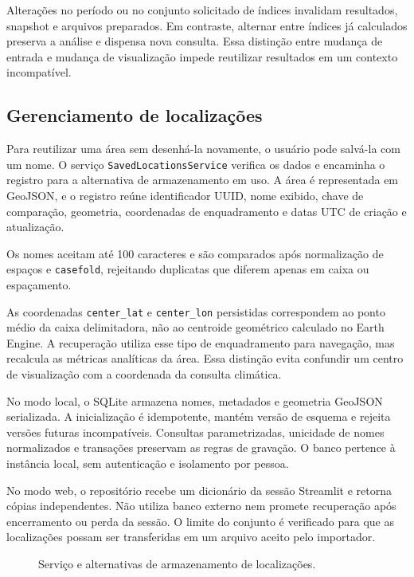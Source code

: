 Alterações no período ou no conjunto solicitado de índices invalidam resultados, snapshot e arquivos preparados. Em contraste, alternar entre índices já calculados preserva a análise e dispensa nova consulta. Essa distinção entre mudança de entrada e mudança de visualização impede reutilizar resultados em um contexto incompatível.

\subsection{Gerenciamento de localizações}

Para reutilizar uma área sem desenhá-la novamente, o usuário pode salvá-la com um nome. O serviço \texttt{SavedLocationsService} verifica os dados e encaminha o registro para a alternativa de armazenamento em uso. A área é representada em GeoJSON, e o registro reúne identificador UUID, nome exibido, chave de comparação, geometria, coordenadas de enquadramento e datas UTC de criação e atualização.

Os nomes aceitam até 100 caracteres e são comparados após normalização de espaços e \texttt{casefold}, rejeitando duplicatas que diferem apenas em caixa ou espaçamento.

As coordenadas \texttt{center\_lat} e \texttt{center\_lon} persistidas correspondem ao ponto médio da caixa delimitadora, não ao centroide geométrico calculado no Earth Engine. A recuperação utiliza esse tipo de enquadramento para navegação, mas recalcula as métricas analíticas da área. Essa distinção evita confundir um centro de visualização com a coordenada da consulta climática.

No modo local, o SQLite armazena nomes, metadados e geometria GeoJSON serializada. A inicialização é idempotente, mantém versão de esquema e rejeita versões futuras incompatíveis. Consultas parametrizadas, unicidade de nomes normalizados e transações preservam as regras de gravação. O banco pertence à instância local, sem autenticação e isolamento por pessoa.

No modo web, o repositório recebe um dicionário da sessão Streamlit e retorna cópias independentes. Não utiliza banco externo nem promete recuperação após encerramento ou perda da sessão. O limite do conjunto é verificado para que as localizações possam ser transferidas em um arquivo aceito pelo importador.

\begin{figure}[htbp]
\centering
\resizebox{0.95\textwidth}{!}{}
\caption{Serviço e alternativas de armazenamento de localizações.}
\label{fig:classes-localizacao}
\end{figure}

